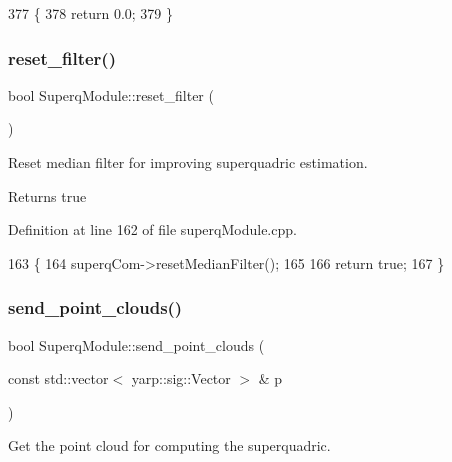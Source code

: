 \begin{DoxyCode}
377 \{
378     \textcolor{keywordflow}{return} 0.0;
379 \}
\end{DoxyCode}
\mbox{\label{classSuperqModule_ae234e2b5b715e64ef928905964660122}} 
\subsubsection{\texorpdfstring{reset\+\_\+filter()}{reset\_filter()}}
{\footnotesize\ttfamily bool Superq\+Module\+::reset\+\_\+filter (\begin{DoxyParamCaption}{ }\end{DoxyParamCaption})\hspace{0.3cm}{\ttfamily [protected]}}



Reset median filter for improving superquadric estimation. 

\begin{DoxyReturn}{Returns}
true 
\end{DoxyReturn}


Definition at line 162 of file superq\+Module.\+cpp.


\begin{DoxyCode}
163 \{
164     superqCom->resetMedianFilter();
165 
166     \textcolor{keywordflow}{return} \textcolor{keyword}{true};
167 \}
\end{DoxyCode}
\mbox{\label{classSuperqModule_aa5a3fb751dd83d96004fceebab14c139}} 
\subsubsection{\texorpdfstring{send\+\_\+point\+\_\+clouds()}{send\_point\_clouds()}}
{\footnotesize\ttfamily bool Superq\+Module\+::send\+\_\+point\+\_\+clouds (\begin{DoxyParamCaption}\item[{const std\+::vector$<$ yarp\+::sig\+::\+Vector $>$ \&}]{p }\end{DoxyParamCaption})\hspace{0.3cm}{\ttfamily [protected]}}



Get the point cloud for computing the superquadric. 



